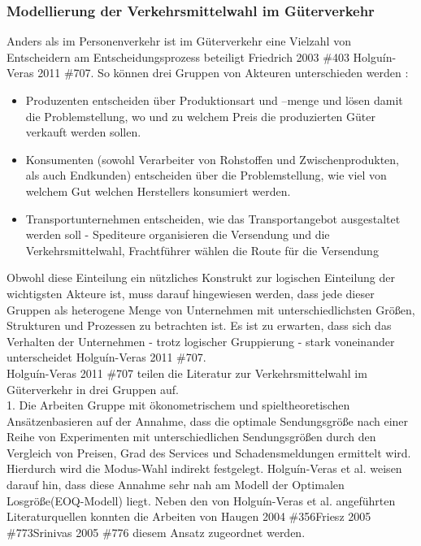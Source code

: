 % 
\subsubsection{Modellierung der Verkehrsmittelwahl im Güterverkehr}
\label{_Toc366766086}
\label{_Toc366775280}
Anders als im Personenverkehr ist im Güterverkehr eine Vielzahl von Entscheidern am Entscheidungsprozess beteiligt {Friedrich 2003 \#403} \autocites[][]{bib.969}{Holguín-Veras 2011 \#707}. So können drei Gruppen von Akteuren unterschieden werden  \autocites[][]{bib.251}:~\\

\begin{itemize}
%
   \item Produzenten entscheiden über Produktionsart und –menge und lösen damit die Problemstellung, wo und zu welchem Preis die produzierten Güter verkauft werden sollen.
   \item Konsumenten (sowohl Verarbeiter von Rohstoffen und Zwischenprodukten, als auch Endkunden) entscheiden über die Problemstellung, wie viel von welchem Gut welchen Herstellers konsumiert werden.
   \item Transportunternehmen entscheiden, wie das Transportangebot ausgestaltet werden soll - Spediteure organisieren die Versendung und die Verkehrsmittelwahl, Frachtführer wählen die Route für die Versendung  \autocites[][]{bib.268}
%
\end{itemize}
Obwohl diese Einteilung ein nützliches Konstrukt zur logischen Einteilung der wichtigsten Akteure ist, muss darauf hingewiesen werden, dass jede dieser Gruppen als heterogene Menge von Unternehmen mit unterschiedlichsten Größen, Strukturen und Prozessen zu betrachten ist. Es ist zu erwarten, dass sich das Verhalten der Unternehmen - trotz logischer Gruppierung - stark voneinander unterscheidet {Holguín-Veras 2011 \#707}. ~\\
{Holguín-Veras 2011 \#707} teilen die Literatur zur Verkehrsmittelwahl im Güterverkehr in drei Gruppen auf.~\\
1. Die Arbeiten \glqq Gruppe mit ökonometrischem und spieltheoretischen Ansätzen\grqq  basieren auf der Annahme, dass die optimale Sendungsgröße nach einer Reihe von Experimenten mit unterschiedlichen Sendungsgrößen durch den Vergleich von Preisen, Grad des Services und Schadensmeldungen ermittelt wird. Hierdurch wird die Modus-Wahl indirekt festgelegt. Holguín-Veras et al. weisen darauf hin, dass diese Annahme sehr nah am Modell der \glqq Optimalen Losgröße\grqq  (EOQ-Modell) liegt. Neben den von Holguín-Veras et al. angeführten Literaturquellen konnten die Arbeiten von {Haugen 2004 \#356}{Friesz 2005 \#773}{Srinivas 2005 \#776} diesem Ansatz zugeordnet werden.~\\
